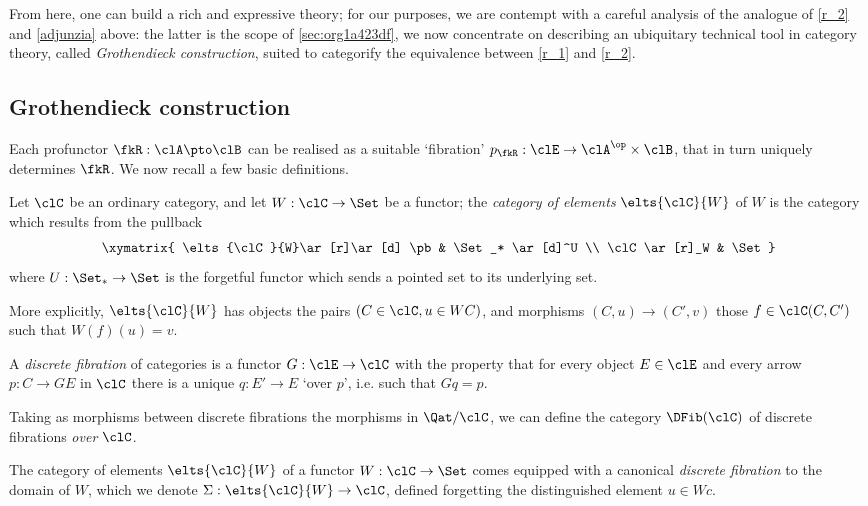 From here, one can build a rich and expressive theory; for our purposes, we are contempt with a careful analysis of the analogue of \ref{r_2} and \eqref{adjunzia} above: the latter is the scope of \autoref{sec:org1a423df}, we now concentrate on describing an ubiquitary technical tool in category theory, called \emph{Gro\-then\-dieck construction}, suited to categorify the equivalence between \ref{r_1} and \ref{r_2}.

\subsection{Gro\-then\-dieck construction}

Each profunctor $\fkR : \clA \pto \clB$ can be realised as a suitable `fibration' $p_\fkR : \clE \to \clA^\op\times\clB$, that in turn uniquely determines $\fkR$.
We now recall a few basic definitions.
\begin{definition}\label{eltsf}
	Let $\clC$ be an ordinary category, and let $W : \clC\to \Set$ be a functor; the \emph{category of elements} $\elts{\clC}{W}$ of $W$ is the category which results from the pullback
	\[
		\xymatrix{
			\elts{\clC}{W}\ar[r]\ar[d] \pb & \Set_* \ar[d]^U \\
			\clC \ar[r]_W & \Set
		}
	\]
	where $U : \Set_*\to\Set$ is the forgetful functor which sends a pointed set to its underlying set.

	More explicitly, $\elts{\clC}{W}$ has objects the pairs $(C\in\clC, u\in WC)$, and morphisms $(C,u)\to (C',v)$ those $f\in \clC(C,C')$ such that $W(f)(u)=v$.
\end{definition}
\begin{definition}
	\label{def:dfib}
	A \emph{discrete fibration} of categories is a functor $G : \clE \to \clC$ with the property that for every object $E\in\clE$ and every arrow $p : C\to GE$ in $\clC$ there is a unique $q : E'\to E$ `over $p$', i.e. such that $Gq=p$.
\end{definition}
Taking as morphisms between discrete fibrations the morphisms in $\Qat/\clC$, we can define the category $\DFib(\clC)$ of discrete fibrations \emph{over} $\clC$.
\begin{proposition}\label{fibelem}
	The category of elements $\elts{\clC}{W}$ of a functor $W : \clC\to \Set$ comes equipped with a canonical \emph{discrete fibration} to the domain of $W$, which we denote $\Sigma : \elts{\clC}{W}\to \clC$, defined forgetting the distinguished element $u\in Wc$.
\end{proposition}
